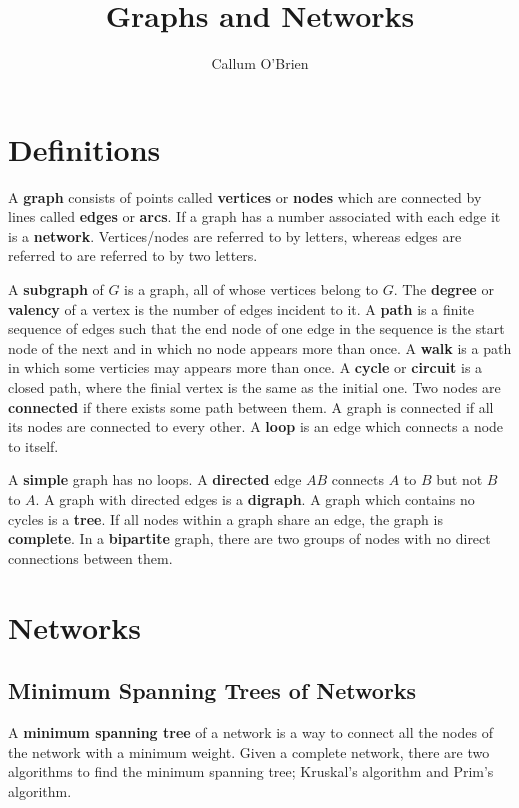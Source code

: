 \documentclass{article}
\title{Graphs and Networks}
\author{Callum O'Brien}
\date{}
\begin{document}
\maketitle
\tableofcontents
\newpage

\section{Definitions}

A \textbf{graph} consists of points called \textbf{vertices} or \textbf{nodes} which are connected by lines called \textbf{edges} or \textbf{arcs}. If a graph has a number associated with each edge it is a \textbf{network}. Vertices/nodes are referred to by letters, whereas edges are referred to are referred to by two letters.

A \textbf{subgraph} of $G$ is a graph, all of whose vertices belong to $G$. The \textbf{degree} or \textbf{valency} of a vertex is the number of edges incident to it. A \textbf{path} is a finite sequence of edges such that the end node of one edge in the sequence is the start node of the next and in which no node appears more than once. A \textbf{walk} is a path in which some verticies may appears more than once. A \textbf{cycle} or \textbf{circuit} is a closed path, where the finial vertex is the same as the initial one. Two nodes are \textbf{connected} if there exists some path between them. A graph is connected if all its nodes are connected to every other. A \textbf{loop} is an edge which connects a node to itself.

A \textbf{simple} graph has no loops. A \textbf{directed} edge $AB$ connects $A$ to $B$ but not $B$ to $A$. A graph with directed edges is a \textbf{digraph}. A graph which contains no cycles is a \textbf{tree}. If all nodes within a graph share an edge, the graph is \textbf{complete}. In a \textbf{bipartite} graph, there are two groups of nodes with no direct connections between them.

\section{Networks}

\subsection{Minimum Spanning Trees of Networks}

A \textbf{minimum spanning tree} of a network is a way to connect all the nodes of the network with a minimum weight. Given a complete network, there are two algorithms to find the minimum spanning tree; Kruskal's algorithm and Prim's algorithm.
\end{document}
